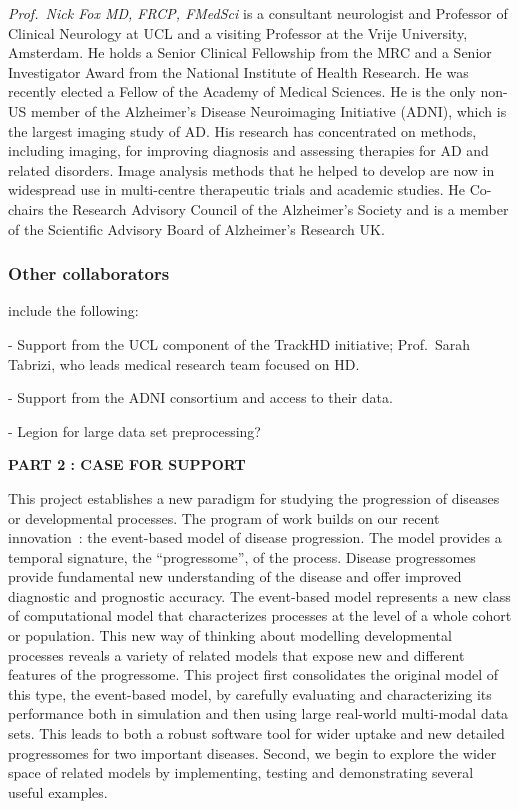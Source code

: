 \documentclass[a4paper,11pt]{article}
\begin{document}
\emph{Prof.\ Nick Fox MD, FRCP, FMedSci} is a consultant neurologist
and Professor of Clinical Neurology at UCL and a visiting Professor at
the Vrije University, Amsterdam. He holds a Senior Clinical Fellowship
from the MRC and a Senior Investigator Award from the National
Institute of Health Research.  He was recently elected a Fellow of the
Academy of Medical Sciences. He is the only non-US member of the
Alzheimer's Disease Neuroimaging Initiative (ADNI), which is
the largest imaging study of AD. His research has concentrated on
methods, including imaging, for improving diagnosis and assessing
therapies for AD and related disorders.  Image analysis methods that
he helped to develop are now in widespread use in multi-centre
therapeutic trials and academic studies.  He Co-chairs the Research
Advisory Council of the Alzheimer's Society and is a member of the
Scientific Advisory Board of Alzheimer's Research UK.


\subsubsection*{Other collaborators}

include the following:

- Support from the UCL component of the TrackHD initiative; Prof.\
Sarah Tabrizi, who leads medical research team focused on HD.

- Support from the ADNI consortium and access to their data.

- Legion for large data set preprocessing?

\clearpage

\textbf{PART 2 : CASE FOR SUPPORT}

This project establishes a new paradigm for studying the progression
of diseases or developmental processes.  The program of work builds on
our recent innovation~\cite{FonteijnScience11}: the event-based model
of disease progression.  The model provides a temporal signature, the
``progressome'', of the process.  Disease progressomes provide
fundamental new understanding of the disease and offer improved
diagnostic and prognostic accuracy.  The event-based model represents
a new class of computational model that characterizes processes at the
level of a whole cohort or population.  This new way of thinking about
modelling developmental processes reveals a variety of related models
that expose new and different features of the progressome.  This
project first consolidates the original model of this type, the
event-based model, by carefully evaluating and characterizing its
performance both in simulation and then using large real-world
multi-modal data sets.  This leads to both a robust software tool for
wider uptake and new detailed progressomes for two important diseases.
Second, we begin to explore the wider space of related models by
implementing, testing and demonstrating several useful examples.
\end{document}
